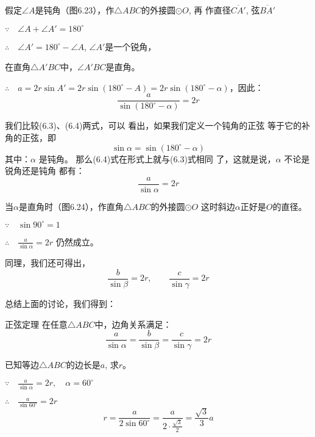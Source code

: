 假定$\angle A$是钝角（图6.23），作$\triangle ABC$的外接圆$\odot O$, 再
作直径$\overline{CA'}$, 弦$\overline{BA'}$

$\because\quad \angle A+\angle A'=180^{\circ}$

$\therefore\quad \angle A'=180^{\circ}-\angle A$, $\angle A'$是一个锐角，

在直角$\triangle A'BC$中，$\angle A'BC$是直角。

$\therefore\quad a=2r\sin A'=2r\sin(180^{\circ}-A)=2r\sin(180^{\circ}-\alpha)$，因此：
\begin{equation}
    \frac{a}{\sin(180^{\circ}-\alpha)}=2r
\end{equation}

我们比较(6.3)、(6.4)两式，可以
看出，如果我们定义一个钝角的正弦
等于它的补角的正弦，即
\[\sin\alpha  =\sin(180^{\circ}-\alpha )\]
其中：$\alpha$ 是钝角。
那么(6.4)式在形式上就与(6.3)式相同
了，这就是说，$\alpha$ 不论是锐角还是钝角
都有：
\[\frac{a}{\sin\alpha}=2r\]

\begin{figure}[htp]
    \centering
{}
    \caption{}
\end{figure}

当$\alpha$是直角时（图6.24），作直角$\triangle ABC$的外接圆$\odot O$
这时斜边$\alpha$正好是$O$的直径。

$\because\quad \sin90^{\circ}=1$

$\therefore\quad \frac{a}{\sin\alpha}=2r$
仍然成立。

同理，我们还可得出，
\[\frac{b}{\sin\beta}=2r,\qquad \frac{c}{\sin\gamma}=2r\]

总结上面的讨论，我们得到：

\begin{blk}
    {正弦定理}
在任意$\triangle ABC$中，边角关系满足：
\[\frac{a}{\sin\alpha}=\frac{b}{\sin\beta}=\frac{c}{\sin\gamma}=2r\]
\end{blk}

\begin{example}
    已知等边$\triangle ABC$的边长是$a$, 求$r$。
\end{example}

\begin{solution}
$\because\quad \frac{a}{\sin\alpha}=2r,\quad \alpha=60^{\circ}$

$\therefore\quad \frac{a}{\sin60^{\circ}}=2r$
\[r=\frac{a}{2\sin60^{\circ}}=\frac{a}{2\cdot \frac{\sqrt{3}}{2}}=\frac{\sqrt{3}}{3}a\]
\end{solution}

